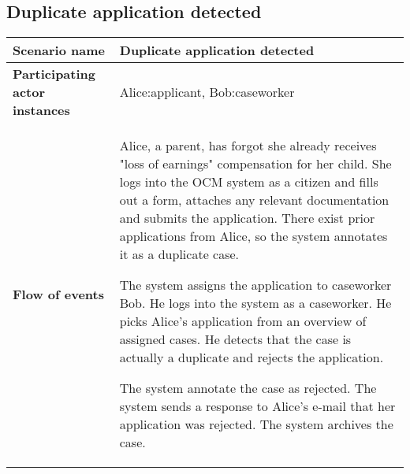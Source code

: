 \subsection*{Duplicate application detected}
\begin{table}[htb!]
\begin{tabularx}{\textwidth}{l|X}
	\textbf{Scenario name} &  Duplicate application detected\\
	\hline
	\textbf{Participating actor instances} & Alice:applicant, Bob:caseworker\\
	\hline
	\textbf{Flow of events} &
    \begin{compactenum}
	        \item Alice, a parent, has forgot she already receives "loss of earnings" compensation for her child. She logs into the OCM system as a citizen and fills out a form, attaches any relevant documentation and submits the application. There exist prior applications from Alice, so the system annotates it as a duplicate case.
	        \item The system assigns the application to caseworker Bob. He logs into the system as a caseworker. He picks Alice's application from an overview of assigned cases. He detects that the case is actually a duplicate and rejects the application.
	        \item The system annotate the case as rejected. The system sends a response to Alice's e-mail that her application was rejected. The system archives the case.
    \end{compactenum}\\
	\hline
\end{tabularx}
\end{table}

\newpage
